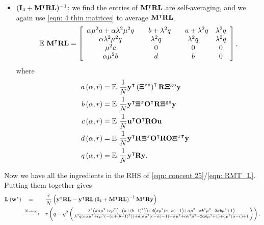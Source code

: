 \documentclass[9pt,twocolumn]{pnas-new}
\begin{document}
\begin{itemize}
    \item $(\mathbf{I}_4+\mathbf{M}^{\intercal}\mathbf{R}\mathbf{L})^{-1}$: we find the entries of $\mathbf{M}^{\intercal}\mathbf{R}\mathbf{L}$ are self-averaging, and we again use \eqref{eqn: 4 thin matrices} to average $\mathbf{M}^{\intercal}\mathbf{R}\mathbf{L}$, 
    \begin{align*}
    \mathbb{E}~\mathbf{M}^{\intercal}\mathbf{R}\mathbf{L} =\left[\begin{array}{cccc}
    \alpha\mu^{2}a+\alpha\lambda^{2}\mu^{2}q & \quad b+\lambda^{2}q & \quad a+\lambda^{2}q & \lambda^{2}q\\
    \alpha\lambda^{2}\mu^{2}q & \lambda^{2}q & \lambda^{2}q & \lambda^{2}q\\
    \mu^{2}c & 0 & 0 & 0\\
    \alpha\mu^{2}b & d & b & 0
    \end{array}\right],
    \end{align*}
where 
    \begin{equation}\label{eq: 5 con values}
    \begin{aligned}
    a\left(\alpha,r\right) & =\mathbb{E}~\frac{1}{N}\mathbf{y}^{\intercal}\left(\boldsymbol{\Xi}^{\text{gn}}\right)^{\intercal}\mathbf{R}{\boldsymbol{\Xi}^{\text{gn}}}\mathbf{y} & \\
    b\left(\alpha,r\right) & =\mathbb{E}~\frac{1}{N}\mathbf{y}^{\intercal}\boldsymbol{\Xi}^{x}\mathbf{O}^{\intercal}\mathbf{R}\boldsymbol{\Xi}^{\text{gn}}\mathbf{y} & \\
    c\left(\alpha,r\right) & =\mathbb{E}~\frac{1}{N}\mathbf{u}^{\intercal}\mathbf{O}^{\intercal}\mathbf{R}\mathbf{O}\mathbf{u} & \\
    d\left(\alpha,r\right) & =\mathbb{E}~\frac{1}{N}\mathbf{y}^{\intercal}\mathbf{R}\boldsymbol{\Xi}^x \mathbf{O}^{\intercal} \mathbf{R}\mathbf{O}{\boldsymbol{\Xi}^{x}}^{\intercal}\mathbf{y} & \\
    q\left(\alpha,r\right) & =\mathbb{E}~\frac{1}{N}\mathbf{y}^{\intercal}\mathbf{R}\mathbf{y}.
    \end{aligned}
    \end{equation}
\end{itemize}
Now we have all the ingredients in the RHS of \eqref{eqn: concent 25}/\eqref{eqn: RMT_L}. Putting them together gives 
\begin{equation}
\begin{aligned}
 \mathbf{L}\left(\mathbf{w}^{*}\right) 
 &\quad=&& \frac{r}{N}\left(\mathbf{y}^{\intercal}\mathbf{R}\mathbf{L}-\mathbf{y}^{\intercal}\mathbf{R}\mathbf{L}\left(\mathbf{I}_4+\mathbf{M}^{\intercal}\mathbf{R}\mathbf{L}\right)^{-1}\mathbf{M}^{\intercal}\mathbf{R}\mathbf{y}\right)\\
 &\xrightarrow{N\to \infty} && r\left(q-q^{2}\left(
\tfrac{\lambda^{2}\left(a\alpha\mu^{2}+c\mu^{2}\left(-\left(a+(b-1)^{2}\right)\right)+d\left(a\mu^{2}(c-\alpha)-1\right)+\alpha\mu^{2}+\alpha b^{2}\mu^{2}-2\alpha b\mu^{2}+1\right)}{\lambda^{2}q\left(a\alpha\mu^{2}+c\mu^{2}\left(-\left(a+(b-1)^{2}\right)\right)+d\left(a\mu^{2}(c-\alpha)-1\right)+\alpha\mu^{2}+\alpha b^{2}\mu^{2}-2\alpha b\mu^{2}+1\right)+a\mu^{2}(\alpha-c)+1}\right)\right).
\end{aligned}
\label{eq: Labcdq}
\end{equation}
\end{document}

